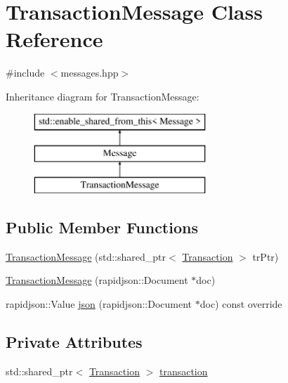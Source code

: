 \hypertarget{classTransactionMessage}{}\section{Transaction\+Message Class Reference}
\label{classTransactionMessage}


{\ttfamily \#include $<$messages.\+hpp$>$}

Inheritance diagram for Transaction\+Message\+:\begin{figure}[H]
\begin{center}
\leavevmode
\includegraphics[height=3.000000cm]{classTransactionMessage}
\end{center}
\end{figure}
\subsection*{Public Member Functions}
\begin{DoxyCompactItemize}
\item 
\mbox{\hyperlink{classTransactionMessage_a8bb90fe0dc9dba6de05f27772f03c708}{Transaction\+Message}} (std\+::shared\+\_\+ptr$<$ \mbox{\hyperlink{classTransaction}{Transaction}} $>$ tr\+Ptr)
\item 
\mbox{\hyperlink{classTransactionMessage_a767282698bcd84202aa9eb59ef4feb2d}{Transaction\+Message}} (rapidjson\+::\+Document $\ast$doc)
\item 
rapidjson\+::\+Value \mbox{\hyperlink{classTransactionMessage_af8675087bd26b6aa0c30a3e3141dda4e}{json}} (rapidjson\+::\+Document $\ast$doc) const override
\end{DoxyCompactItemize}
\subsection*{Private Attributes}
\begin{DoxyCompactItemize}
\item 
std\+::shared\+\_\+ptr$<$ \mbox{\hyperlink{classTransaction}{Transaction}} $>$ \mbox{\hyperlink{classTransactionMessage_a5949ed4449ab8031ffc6342268b981ff}{transaction}}
\end{DoxyCompactItemize}
